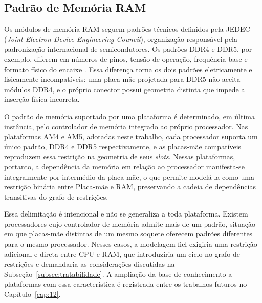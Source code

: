 \subsection{Padrão de Memória RAM}
Os módulos de memória RAM seguem padrões técnicos definidos pela JEDEC (\textit{Joint Electron Device Engineering Council}), organização
responsável pela padronização internacional de semicondutores. Os padrões DDR4 e DDR5, por exemplo, diferem em números de pinos, tensão de operação,
frequência base e formato físico do encaixe \cite{JEDEC2020}. Essa diferença torna os dois padrões eletricamente e fisicamente incompatíveis:
uma placa-mãe projetada para DDR5 não aceita módulos DDR4, e o próprio conector possui geometria distinta que impede a inserção física incorreta.

O padrão de memória suportado por uma plataforma é determinado, em última instância, pelo controlador de memória
integrado ao próprio processador. Nas plataformas AM4 e AM5, adotadas neste trabalho, cada processador suporta um
único padrão, DDR4 e DDR5 respectivamente, e as placas-mãe compatíveis reproduzem essa restrição na geometria de
seus \textit{slots}. Nessas plataformas, portanto, a dependência da memória em relação ao processador manifesta-se
integralmente por intermédio da placa-mãe, o que permite modelá-la como uma restrição binária entre Placa-mãe e RAM,
preservando a cadeia de dependências transitivas do grafo de restrições.

Essa delimitação é intencional e não se generaliza a toda plataforma. Existem processadores cujo controlador de
memória admite mais de um padrão, situação em que placas-mãe distintas de um mesmo soquete oferecem padrões
diferentes para o mesmo processador. Nesses casos, a modelagem fiel exigiria uma restrição adicional e direta entre
CPU e RAM, que introduziria um ciclo no grafo de restrições e demandaria as considerações discutidas na
Subseção~\ref{subsec:tratabilidade}. A ampliação da base de conhecimento a plataformas com essa característica é
registrada entre os trabalhos futuros no Capítulo~\ref{cap:12}.

